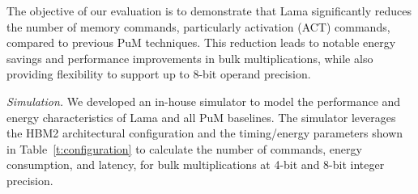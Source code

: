 \begin{table}[t!]
\caption{Architectural Parameters for Lama.}
\label{t:configuration}
\begin{center}
\end{center}
\end{table}

The objective of our evaluation is to demonstrate that Lama significantly reduces the number of memory commands, particularly activation (ACT) commands, compared to previous PuM techniques. This reduction leads to notable energy savings and performance improvements in bulk multiplications, while also providing flexibility to support up to 8-bit operand precision.

\textit{Simulation.} We developed an in-house simulator to model the performance and energy characteristics of Lama and all PuM baselines. The simulator leverages the HBM2 architectural configuration and the timing/energy parameters shown in Table~\ref{t:configuration} to calculate the number of commands, energy consumption, and latency, for bulk multiplications at 4-bit and 8-bit integer precision.

